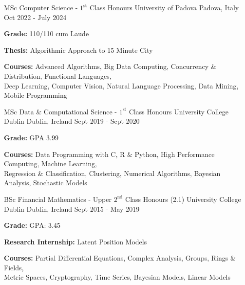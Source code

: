 
\begin{cventries}

  \cventry
    {MSc Computer Science - $1^{\text{st}}$ Class Honours} %
    {University of Padova} %
    {Padova, Italy} %
    {Oct 2022 - July 2024} %
    {
      \begin{cvitems} %
        \item{\textbf{Grade:} 110/110 cum Laude}
        \item {\textbf{Thesis:} Algorithmic Approach to 15 Minute City}
        \item {\textbf{Courses:} Advanced Algorithms, Big Data Computing, Concurrency \& Distribution, Functional Languages, \\  Deep Learning, Computer Vision, Natural Language Processing, Data Mining, Mobile Programming}
      \end{cvitems}
    }
    
  \cventry
    {MSc Data \& Computational Science - $1^{\text{st}}$ Class Honours} %
    {University College Dublin} %
    {Dublin, Ireland} %
    {Sept 2019 - Sept 2020} %
    {
      \begin{cvitems} %
        \item {\textbf{Grade:} GPA 3.99}
        \item {\textbf{Courses:} Data Programming with C, R \& Python, High Performance Computing, Machine Learning, \\  Regression \& Classification, Clustering, Numerical Algorithms, Bayesian Analysis, Stochastic Models}
      \end{cvitems}
    }
    
  \cventry
    {BSc Financial Mathematics - Upper $2^{\text{nd}}$ Class Honours (2.1)} %
    {University College Dublin} %
    {Dublin, Ireland} %
    {Sept 2015 - May 2019} %
    {
      \begin{cvitems} %
        \item {\textbf{Grade:} GPA: 3.45}
        \item {\textbf{Research Internship:} Latent Position Models}
        \item {\textbf{Courses:} Partial Differential Equations, Complex Analysis, Groups, Rings \& Fields, \\  Metric Spaces, Cryptography, Time Series, Bayesian Models, Linear Models}
      \end{cvitems}
    }
\end{cventries}
